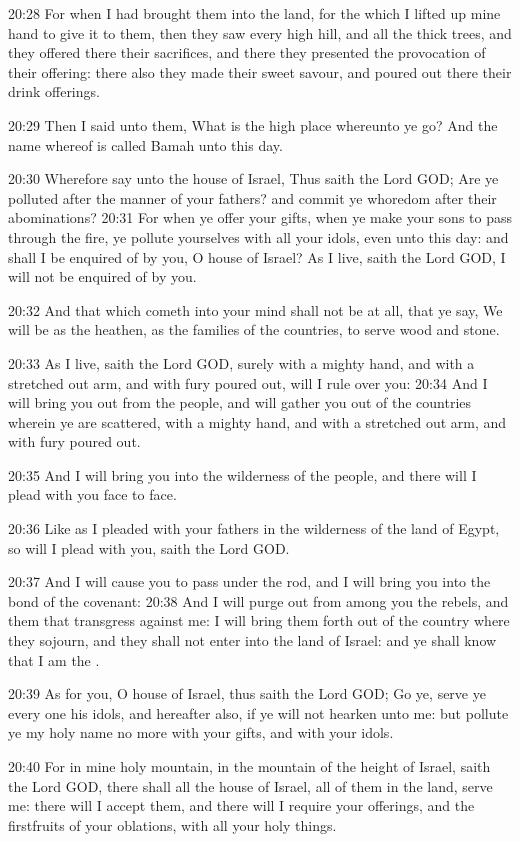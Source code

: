 20:28 For when I had brought them into the land, for the which I
lifted up mine hand to give it to them, then they saw every high hill,
and all the thick trees, and they offered there their sacrifices, and
there they presented the provocation of their offering: there also
they made their sweet savour, and poured out there their drink
offerings.

20:29 Then I said unto them, What is the high place whereunto ye go?
And the name whereof is called Bamah unto this day.

20:30 Wherefore say unto the house of Israel, Thus saith the Lord GOD;
Are ye polluted after the manner of your fathers? and commit ye
whoredom after their abominations?  20:31 For when ye offer your
gifts, when ye make your sons to pass through the fire, ye pollute
yourselves with all your idols, even unto this day: and shall I be
enquired of by you, O house of Israel? As I live, saith the Lord GOD,
I will not be enquired of by you.

20:32 And that which cometh into your mind shall not be at all, that
ye say, We will be as the heathen, as the families of the countries,
to serve wood and stone.

20:33 As I live, saith the Lord GOD, surely with a mighty hand, and
with a stretched out arm, and with fury poured out, will I rule over
you: 20:34 And I will bring you out from the people, and will gather
you out of the countries wherein ye are scattered, with a mighty hand,
and with a stretched out arm, and with fury poured out.

20:35 And I will bring you into the wilderness of the people, and
there will I plead with you face to face.

20:36 Like as I pleaded with your fathers in the wilderness of the
land of Egypt, so will I plead with you, saith the Lord GOD.

20:37 And I will cause you to pass under the rod, and I will bring you
into the bond of the covenant: 20:38 And I will purge out from among
you the rebels, and them that transgress against me: I will bring them
forth out of the country where they sojourn, and they shall not enter
into the land of Israel: and ye shall know that I am the \LORD.

20:39 As for you, O house of Israel, thus saith the Lord GOD; Go ye,
serve ye every one his idols, and hereafter also, if ye will not
hearken unto me: but pollute ye my holy name no more with your gifts,
and with your idols.

20:40 For in mine holy mountain, in the mountain of the height of
Israel, saith the Lord GOD, there shall all the house of Israel, all
of them in the land, serve me: there will I accept them, and there
will I require your offerings, and the firstfruits of your oblations,
with all your holy things.

